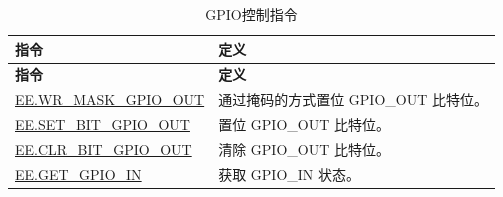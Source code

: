 \begin{longtable}[c]{|l|m{10cm}|}
    \caption{GPIO控制指令}
    \label{tab:pie-gpio-指令s}\\
    \hline
    \rowcolor{lightgray}
    \textbf{指令} & \textbf{定义} \\\hline
    \endfirsthead
    \rowcolor{lightgray}
    \textbf{指令} & \textbf{定义} \\\hline
    \endhead
    \endfoot
    
    \hyperref[instruction:EEWRMASKGPIOOUT]{EE.WR\_MASK\_GPIO\_OUT} & 通过掩码的方式置位 GPIO\_OUT 比特位。
    \\\hline
    \hyperref[instruction:EESETBITGPIOOUT]{EE.SET\_BIT\_GPIO\_OUT} & 置位 GPIO\_OUT 比特位。
    \\\hline
    \hyperref[instruction:EECLRBITGPIOOUT]{EE.CLR\_BIT\_GPIO\_OUT} & 清除 GPIO\_OUT 比特位。
    \\\hline
    \hyperref[instruction:EEGETGPIOIN]{EE.GET\_GPIO\_IN} & 获取 GPIO\_IN 状态。
    \\\hline
\end{longtable}